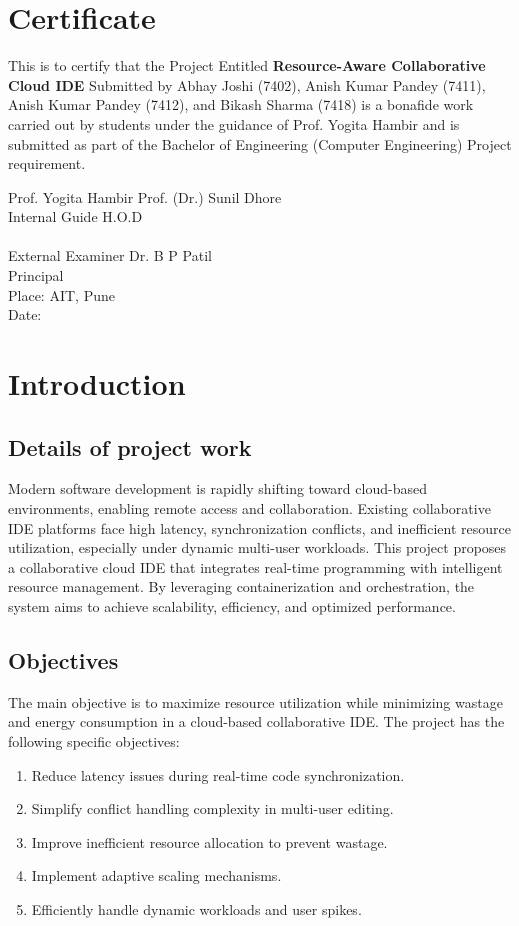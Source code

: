 \documentclass[12pt,a4paper]{report}
\begin{document}
\chapter*{Certificate}
This is to certify that the Project Entitled \textbf{Resource-Aware Collaborative Cloud IDE} Submitted by Abhay Joshi (7402), Anish Kumar Pandey (7411), Anish Kumar Pandey (7412), and Bikash Sharma (7418) is a bonafide work carried out by students under the guidance of Prof. Yogita Hambir and is submitted as part of the Bachelor of Engineering (Computer Engineering) Project requirement.

\vspace{2cm}
\noindent
Prof. Yogita Hambir \hfill Prof. (Dr.) Sunil Dhore \\
Internal Guide \hfill H.O.D \\
\vspace{2cm} \\
External Examiner \hfill Dr. B P Patil \\
\hfill Principal \\
Place: AIT, Pune \\
Date:

\tableofcontents
\listoffigures

\chapter{Introduction}
\section{Details of project work}
Modern software development is rapidly shifting toward cloud-based environments, enabling remote access and collaboration. Existing collaborative IDE platforms face high latency, synchronization conflicts, and inefficient resource utilization, especially under dynamic multi-user workloads. This project proposes a collaborative cloud IDE that integrates real-time programming with intelligent resource management. By leveraging containerization and orchestration, the system aims to achieve scalability, efficiency, and optimized performance.

\section{Objectives}
The main objective is to maximize resource utilization while minimizing wastage and energy consumption in a cloud-based collaborative IDE.
The project has the following specific objectives:
\begin{enumerate}
    \item Reduce latency issues during real-time code synchronization.
    \item Simplify conflict handling complexity in multi-user editing.
    \item Improve inefficient resource allocation to prevent wastage.
    \item Implement adaptive scaling mechanisms.
    \item Efficiently handle dynamic workloads and user spikes.
\end{enumerate}
\end{document}
